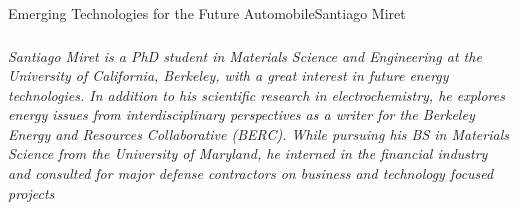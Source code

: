 \documentclass{papertex}
\begin{document}
\begin{news}{2}{Emerging Technologies for the Future Automobile}{Santiago Miret}{}{}
\subsubsection*{}

\emph{Santiago Miret is a PhD student in Materials Science and Engineering at
the University of California, Berkeley, with a great interest in future energy
technologies. In addition to his scientific research in electrochemistry, he
explores energy issues from interdisciplinary perspectives as a writer for the
Berkeley Energy and Resources Collaborative (BERC). While pursuing his BS in
Materials Science from the University of Maryland, he interned in the financial
industry and consulted for major defense contractors on business and technology
focused projects}

\end{news}
\end{document}
